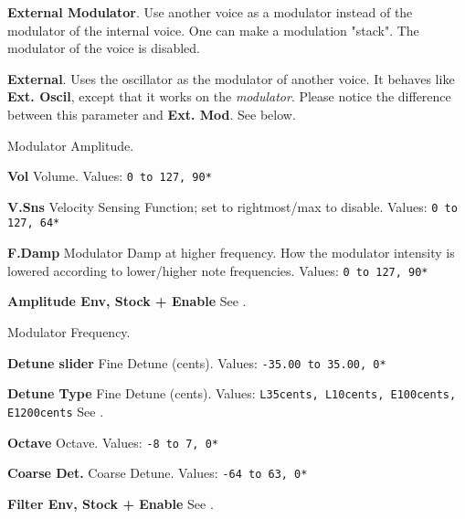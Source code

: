    \textbf{External Modulator}.
   Use another voice as a modulator instead of the modulator of the internal
   voice. One can make a modulation "stack". The modulator of the voice is
   disabled. 

   \textbf{External}.
   Uses the oscillator as the modulator of another voice. It
   behaves like \textbf{Ext. Oscil}, except that it works on the
   \textsl{modulator}. Please
   notice the difference between this parameter and \textbf{Ext. Mod}. 
   See below.

   Modulator Amplitude.

   \begin{enumber}
      \item \textbf{Vol}
         Volume.
         Values: \texttt{0 to 127, 90*}
      \item \textbf{V.Sns}
         Velocity Sensing Function; set to rightmost/max to disable.
         Values: \texttt{0 to 127, 64*}
      \item \textbf{F.Damp}
         Modulator Damp at higher frequency.
         How the modulator intensity is lowered according to lower/higher
         note frequencies. 
         Values: \texttt{0 to 127, 90*}
      \item \textbf{Amplitude Env, Stock + Enable}
         See .
   \end{enumber}

   Modulator Frequency.

   \begin{enumber}
      \item \textbf{Detune slider}
         Fine Detune (cents).
         Values: \texttt{-35.00 to 35.00, 0*}
      \item \textbf{Detune Type}
         Fine Detune (cents).
         Values: \texttt{L35cents, L10cents, E100cents, E1200cents}
         See .
      \item \textbf{Octave}
         Octave.
         Values: \texttt{-8 to 7, 0*}
      \item \textbf{Coarse Det.}
         Coarse Detune.
         Values: \texttt{-64 to 63, 0*}
      \item \textbf{Filter Env, Stock + Enable}
         See .
   \end{enumber}

